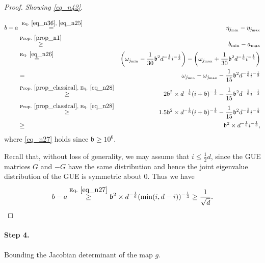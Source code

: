 \documentclass[11pt,letterpaper]{article}
\begin{document}
\begin{proof}
\noindent
  {\em Showing \eqref{eq_n42}.}

\begin{eqnarray}
    b-a  &\stackrel{\textrm{ Eq. } \eqref{eq_n36}, \,\, \eqref{eq_n25}}{=} &\eta_{j_{\mathrm{min}}} - \eta_{j_{\mathrm{max}}}\nonumber\\
    &\stackrel{\textrm{Prop. } \ref{prop_n1}}{\geq}& b_{\mathrm{min}} - a_{\mathrm{max}} \nonumber\\
    &\stackrel{\textrm{Eq. } \eqref{eq_n26}}{=}& \left(\omega_{j_{\mathrm{min}}} - \frac{1}{30} \mathfrak{b}^2 d^{-\frac{1}{6}} i^{-\frac{1}{3}}\right) - \left(\omega_{j_{\mathrm{max}}} + \frac{1}{30} \mathfrak{b}^2 d^{-\frac{1}{6}} i^{-\frac{1}{3}}\right)\nonumber\\
    &=& \omega_{j_{\mathrm{min}}} - \omega_{j_{\mathrm{max}}} - \frac{1}{15} \mathfrak{b}^2 d^{-\frac{1}{6}} i^{-\frac{1}{3}}\nonumber\\
      &\stackrel{\textrm{Prop. } \ref{prop_classical}, \, \, \textrm{Eq. } \eqref{eq_n28}}{\geq} &  2\mathfrak{b}^2 \times d^{-\frac{1}{6}} (i+  \mathfrak{b})^{-\frac{1}{3}} - \frac{1}{15} \mathfrak{b}^2 d^{-\frac{1}{6}} i^{-\frac{1}{3}}\nonumber\\
            &\stackrel{\textrm{Prop. } \ref{prop_classical}, \, \, \textrm{Eq. } \eqref{eq_n28}}{\geq} &  1.5\mathfrak{b}^2 \times d^{-\frac{1}{6}} (i+  \mathfrak{b})^{-\frac{1}{3}} - \frac{1}{15} \mathfrak{b}^2 d^{-\frac{1}{6}} i^{-\frac{1}{3}}\nonumber\\
          &\geq&  \mathfrak{b}^2 \times d^{-\frac{1}{6}} i^{-\frac{1}{3}}, \label{eq_n27}
%   
\end{eqnarray}
%
where \eqref{eq_n27} holds since $\mathfrak{b} \geq 10^6$.

Recall that, without loss of generality, we may assume that $i \leq \frac{1}{2}d$,  since the GUE matrices $G$ and $-G$ have the same distribution and hence the joint eigenvalue distribution of the GUE is symmetric about $0$.
%
Thus we have
%
\begin{equation*}
    b-a \stackrel{\textrm{Eq. } \eqref{eq_n27}}{\geq}  \mathfrak{b}^2 \times d^{-\frac{1}{6}} (\min(i, d-i))^{-\frac{1}{3}} \geq  \frac{1}{\sqrt{d}}.
\end{equation*}
%
%
\end{proof}



\paragraph{Step 4.} Bounding the Jacobian determinant of the map $g$.
\end{document}
